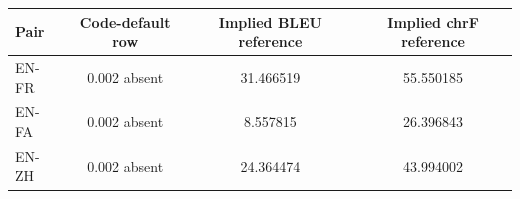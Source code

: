 \begingroup
\fontsize{7}{8.4}\selectfont
\setlength{\tabcolsep}{3pt}
\begin{tabular}{lccc}
\toprule
\textbf{Pair} & \textbf{Code-default row} & \textbf{Implied BLEU reference} & \textbf{Implied chrF reference} \\
\midrule
EN-FR & 0.002 absent & 31.466519 & 55.550185 \\
EN-FA & 0.002 absent & 8.557815 & 26.396843 \\
EN-ZH & 0.002 absent & 24.364474 & 43.994002 \\
\bottomrule
\end{tabular}
\endgroup
